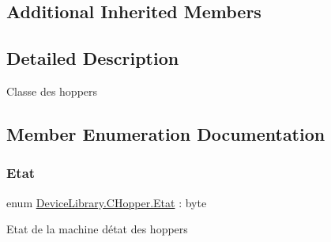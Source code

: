 \subsection*{Additional Inherited Members}


\subsection{Detailed Description}
Classe des hoppers 



\subsection{Member Enumeration Documentation}
\mbox{\label{class_device_library_1_1_c_hopper_a5f54d84c3b2a93420c8ff69b1351c77a}} 
\subsubsection{\texorpdfstring{Etat}{Etat}}
{\footnotesize\ttfamily enum \mbox{\hyperlink{class_device_library_1_1_c_hopper_a5f54d84c3b2a93420c8ff69b1351c77a}{Device\+Library.\+C\+Hopper.\+Etat}} \+: byte\hspace{0.3cm}{\ttfamily [strong]}}



Etat de la machine d\textquotesingle{}état des hoppers 

